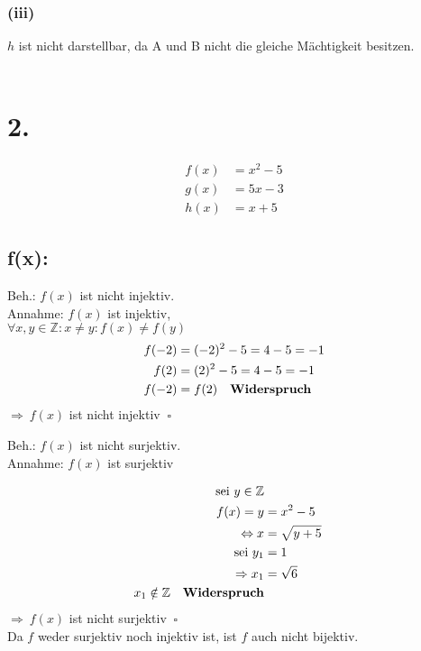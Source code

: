 \documentclass[a4paper]{scrartcl}
\newcommand{\qed}{\ \square}
\begin{document}
\subsubsection{(iii)}
	\(h\) ist nicht darstellbar, da A und B nicht die gleiche Mächtigkeit besitzen.
\\
\\

\section{2.}
	\begin{align}
		f(x) &= x^2-5 \\
		g(x) &= 5x-3 \\
		h(x) &= x+5
	\end{align}

\subsection{f(x):}
	Beh.: \(f(x)\) ist nicht injektiv.\\
	Annahme: \(f(x)\) ist injektiv,\\
	\(\forall x,y \in \mathbb{Z}:x\neq y : f(x) \neq f(y)\)\\
	\begin{align}
		f(-2)&= (-2)^2-5 = 4-5 = -1\\
		f(2) &= (2)^2-5 = 4-5 = -1 \\
		f(-2)&= f(2) \quad \text{\textbf{Widerspruch}}
	\end{align}
	\(\Rightarrow \ f(x)\) ist nicht injektiv \(\qed\) \\
	\newpage
	\begin{flushleft}
		Beh.: \(f(x)\) ist nicht surjektiv.\\
		Annahme: \(f(x)\) ist surjektiv\\
	\end{flushleft}
	\begin{align}
		\text{sei } y\in \mathbb{Z}\\
		f(x) =y &=x^2-5\\
		\Leftrightarrow x &= \sqrt{y+5}\\
		\text{sei } y_1 &= 1\\
		\Rightarrow x_1&=\sqrt{6}\\
		x_1\notin \mathbb{Z}\quad \text{\textbf{Widerspruch}}
	\end{align}
	\(\Rightarrow \ f(x)\) ist nicht surjektiv \(\qed\) \\
	Da \(f\) weder surjektiv noch injektiv ist, ist \(f\) auch nicht bijektiv.\\
\end{document}
